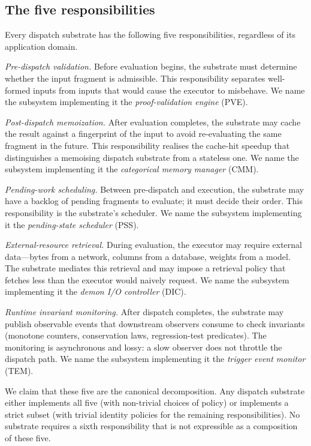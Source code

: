 \documentclass[twocolumn,11pt,a4paper]{article}
\begin{document}
\subsection{The five responsibilities}

Every dispatch substrate has the following five responsibilities, regardless of its application domain.

\emph{Pre-dispatch validation.} Before evaluation begins, the substrate must determine whether the input fragment is admissible. This responsibility separates well-formed inputs from inputs that would cause the executor to misbehave. We name the subsystem implementing it the \emph{proof-validation engine} (PVE).

\emph{Post-dispatch memoization.} After evaluation completes, the substrate may cache the result against a fingerprint of the input to avoid re-evaluating the same fragment in the future. This responsibility realises the cache-hit speedup that distinguishes a memoising dispatch substrate from a stateless one. We name the subsystem implementing it the \emph{categorical memory manager} (CMM).

\emph{Pending-work scheduling.} Between pre-dispatch and execution, the substrate may have a backlog of pending fragments to evaluate; it must decide their order. This responsibility is the substrate's scheduler. We name the subsystem implementing it the \emph{pending-state scheduler} (PSS).

\emph{External-resource retrieval.} During evaluation, the executor may require external data---bytes from a network, columns from a database, weights from a model. The substrate mediates this retrieval and may impose a retrieval policy that fetches less than the executor would naively request. We name the subsystem implementing it the \emph{demon I/O controller} (DIC).

\emph{Runtime invariant monitoring.} After dispatch completes, the substrate may publish observable events that downstream observers consume to check invariants (monotone counters, conservation laws, regression-test predicates). The monitoring is asynchronous and lossy: a slow observer does not throttle the dispatch path. We name the subsystem implementing it the \emph{trigger event monitor} (TEM).

We claim that these five are the canonical decomposition. Any dispatch substrate either implements all five (with non-trivial choices of policy) or implements a strict subset (with trivial identity policies for the remaining responsibilities). No substrate requires a sixth responsibility that is not expressible as a composition of these five.
\end{document}
